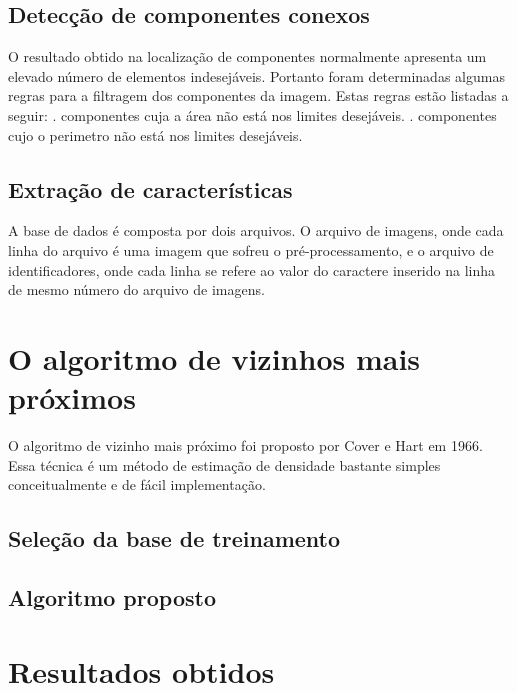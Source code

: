 \documentclass[
	article,			%
	11pt,				%
	oneside,			%
	a4paper,			%
	english,			%
	brazil,				%
	sumario=tradicional
	]{abntex2}
\begin{document}
\subsection{Detecção de componentes conexos}
      O resultado obtido na localização de componentes normalmente apresenta
um elevado número de elementos indesejáveis.
      Portanto foram determinadas algumas regras para a filtragem dos
componentes da imagem. Estas regras estão listadas a seguir:      . componentes cuja a área não está nos limites desejáveis. . componentes cujo o perimetro não está nos limites desejáveis.\newline



\subsection{Extração de características}

A base de dados é composta por dois arquivos. O arquivo de imagens, onde cada
linha do arquivo é uma imagem que sofreu o pré-processamento, e o arquivo de
identificadores, onde cada linha se refere ao valor do caractere inserido na
linha de mesmo número do arquivo de imagens.


\section{O algoritmo de vizinhos mais próximos}
O algoritmo de vizinho mais próximo foi proposto por Cover e Hart em 1966. Essa
técnica é um método de estimação de densidade bastante simples conceitualmente e de fácil
implementação.

\subsection{Seleção da base de treinamento}

\subsection{Algoritmo proposto}


\section{Resultados obtidos}
\end{document}
